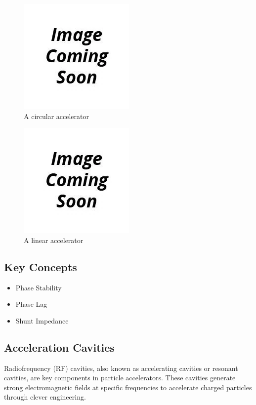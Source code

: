 \documentclass[a4paper,oneside,12pt]{report}
\numberwithin{equation}{chapter}
\begin{document}
\begin{figure}[H]
    \centering
    \includegraphics[scale=0.75]{./figures/to_be_added.png}
    \caption{A circular accelerator}
\end{figure}

\begin{figure}[H]
    \centering
    \includegraphics[scale=0.75]{./figures/to_be_added.png}
    \caption{A linear accelerator}
\end{figure}

\subsection{Key Concepts}

\begin{itemize}
    \item Phase Stability
    \item Phase Lag
    \item Shunt Impedance
    
\end{itemize}

\subsection{Acceleration Cavities} \label{sec:theory_cavities}
Radiofrequency (RF) cavities, also known as accelerating cavities or resonant cavities, are key components in particle accelerators. 
These cavities generate strong electromagnetic fields at specific frequencies to accelerate charged particles through clever engineering.
\end{document}
